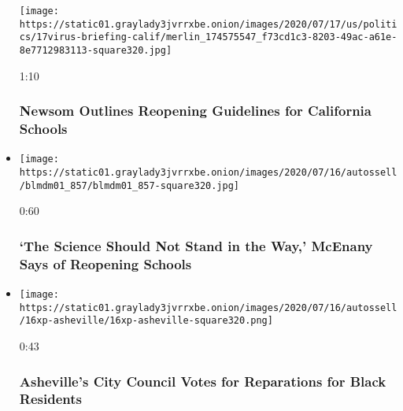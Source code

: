 \begin{itemize}
  \texttt{[image: https://static01.graylady3jvrrxbe.onion/images/2020/07/17/us/politics/17virus-briefing-calif/merlin\_174575547\_f73cd1c3-8203-49ac-a61e-8e7712983113-square320.jpg]}

  1:10

  \hypertarget{newsom-outlines-reopening-guidelines-for-california-schools}{%
  \subsubsection{Newsom Outlines Reopening Guidelines for California
  Schools}\label{newsom-outlines-reopening-guidelines-for-california-schools}}
\item
  \href{https://www.nytimes3xbfgragh.onion/video/us/100000007243015/mcenany-trump-coronavirus-schools-science.html?action=click\&module=video-series-bar\&region=header\&pgtype=Article\&playlistId=video/u-s}{}

  \texttt{[image: https://static01.graylady3jvrrxbe.onion/images/2020/07/16/autossell/blmdm01\_857/blmdm01\_857-square320.jpg]}

  0:60

  \hypertarget{the-science-should-not-stand-in-the-way-mcenany-says-of-reopening-schools}{%
  \subsubsection{`The Science Should Not Stand in the Way,' McEnany Says
  of Reopening
  Schools}\label{the-science-should-not-stand-in-the-way-mcenany-says-of-reopening-schools}}
\item
  \href{https://www.nytimes3xbfgragh.onion/video/us/100000007242196/asheville-reparations-north-carolina.html?action=click\&module=video-series-bar\&region=header\&pgtype=Article\&playlistId=video/u-s}{}

  \texttt{[image: https://static01.graylady3jvrrxbe.onion/images/2020/07/16/autossell/16xp-asheville/16xp-asheville-square320.png]}

  0:43

  \hypertarget{ashevilles-city-council-votes-for-reparations-for-black-residents}{%
  \subsubsection{Asheville's City Council Votes for Reparations for
  Black
  Residents}\label{ashevilles-city-council-votes-for-reparations-for-black-residents}}
\end{itemize}

